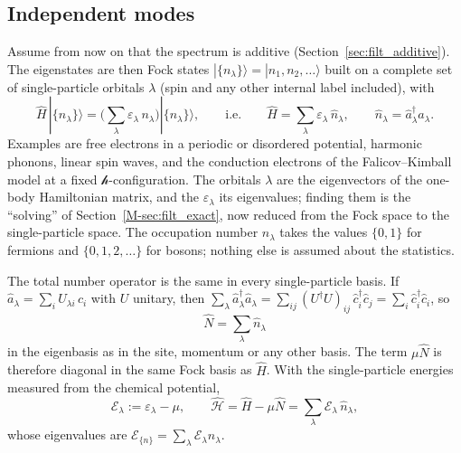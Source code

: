 \documentclass[10pt,a4paper]{article}
\theoremstyle{plain}
\theoremstyle{remark}
\newcommand{\hfield}{\mathscr{h}}  %
\newcommand{\enrg}{\mathcal{E}}  %
\begin{document}
\subsection{Independent modes}
\label{sec:filt_twolevel}

Assume from now on that the spectrum is additive (Section~\ref{sec:filt_additive}).
The eigenstates are then Fock
states $ |\{n_\lambda\}\rangle = |n_1, n_2, \dots\rangle $ built on a complete set of
single-particle orbitals $ \lambda $ (spin and any other internal label included),
with
\[
\hat H\,|\{n_\lambda\}\rangle=\Big(\sum_\lambda\varepsilon_\lambda\,n_\lambda\Big)|\{n_\lambda\}\rangle ,
\qquad\text{i.e.}\qquad
\hat H=\sum_\lambda\varepsilon_\lambda\,\hat n_\lambda ,
\qquad \hat n_\lambda = \hat a^\dagger_\lambda\hat a_\lambda .
\]
Examples are free electrons in a periodic or disordered potential, harmonic
phonons, linear spin waves, and the conduction electrons of the Falicov--Kimball
model at a fixed $ \hfield $-configuration. The orbitals $ \lambda $ are the eigenvectors of
the one-body Hamiltonian matrix, and the $ \varepsilon_\lambda $ its eigenvalues;
finding them is the ``solving'' of Section~\ref{M-sec:filt_exact}, now reduced from the
Fock space to the single-particle space. The occupation number $ n_\lambda $ takes the
values $ \{0,1\} $ for fermions and $ \{0,1,2,\dots\} $ for bosons; nothing else is
assumed about the statistics.

The total number operator is the same in every single-particle basis. If
$ \hat a_\lambda = \sum_i U_{\lambda i}\,\hat c_i $ with $ U $ unitary, then
$ \sum_\lambda \hat a^\dagger_\lambda\hat a_\lambda = \sum_{ij}
(U^\dagger U)_{ij}\,\hat c^\dagger_i\hat c_j = \sum_i \hat c^\dagger_i\hat c_i $, so
\[
\hat N=\sum_\lambda\hat n_\lambda
\]
in the eigenbasis as in the site, momentum or any other basis. The term
$ \mu\hat N $ is therefore diagonal in the same Fock basis as $ \hat H $. With the
single-particle energies measured from the chemical potential,
\[
  \enrg_\lambda := \varepsilon_\lambda - \mu ,
  \qquad
  \hat{\mathcal{H}} = \hat H - \mu\hat N = \sum_\lambda \enrg_\lambda\,\hat n_\lambda ,
\]
whose eigenvalues are $ \enrg_{\{n\}} = \sum_\lambda\enrg_\lambda n_\lambda $.
\end{document}
